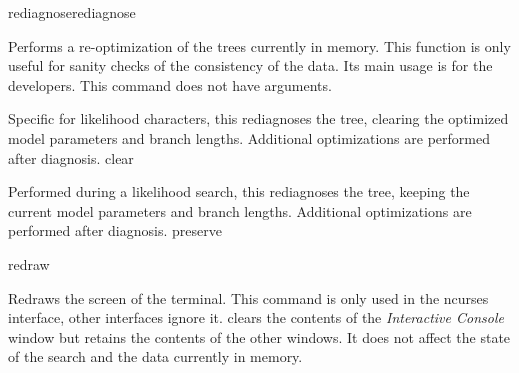 \begin{command}{rediagnose}{rediagnose}

	\syntax{\obligatory{()}}

	\begin{poydescription}
        Performs a re-optimization of the trees currently in memory. This
        function is only useful for sanity checks of the consistency of the data.
        Its main usage is for the \poy developers. This command does not have
        arguments.
	\end{poydescription}

    \begin{arguments}
        {Specific for likelihood characters, this rediagnoses the tree, clearing
        the optimized model parameters and branch lengths. Additional
        optimizations are performed after diagnosis.}
        {clear}

        {Performed during a likelihood search, this rediagnoses the tree,
        keeping the current model parameters and branch lengths. Additional
        optimizations are performed after diagnosis.}
        {preserve}

    \end{arguments}
 
    \begin{poyexamples}
    \end{poyexamples}

\end{command}

\begin{command}{redraw}{}

	\syntax{\obligatory{()}}

	\begin{poydescription}
        Redraws the screen of the terminal. This command is only used in the ncurses
        interface, other interfaces ignore it.  clears the
        contents of the \emph{Interactive Console} window but retains the contents
        of the other windows. It does not affect the state of the search and the data
        currently in memory.
	\end{poydescription}

    \begin{poyexamples}
    \end{poyexamples}

\end{command}

